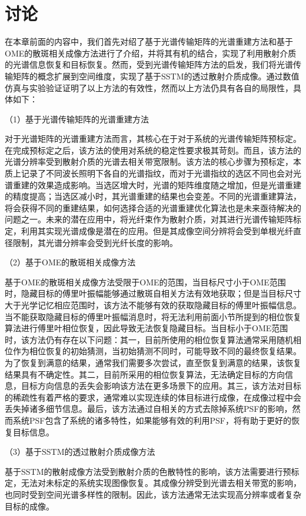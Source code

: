 \section{讨论}

在本章前面的内容中，我们首先对绍了基于光谱传输矩阵的光谱重建方法和基于OME的散斑相关成像方法进行了介绍，并将其有机的结合，实现了利用散射介质的光谱信息恢复和目标恢复。然而，受到光谱传输矩阵方法的启发，我们将光谱传输矩阵的概念扩展到空间维度，实现了基于SSTM的透过散射介质成像。通过数值仿真与实验验证证明了以上方法的有效性，然而以上方法仍具有各自的局限性，具体如下：

（1）基于光谱传输矩阵的光谱重建方法

对于光谱矩阵的光谱重建方法而言，其核心在于对于系统的光谱传输矩阵预标定。在完成预标定之后，该方法的使用对系统的稳定性要求极其苛刻。而且，该方法的光谱分辨率受到散射介质的光谱去相关带宽限制。该方法的核心步骤为预标定，本质上记录了不同波长照明下各自的光谱指纹，而对于光谱指纹的选区不同也会对光谱重建的效果造成影响。当选区增大时，光谱的矩阵维度随之增加，但是光谱重建的精度提高；当选区减小时，其光谱重建的结果也会变差。不同的光谱重建算法，将会获得不同的重建结果，如何选择合适的光谱重建优化算法也是未来亟待解决的问题之一。未来的潜在应用中，将光纤束作为散射介质，对其进行光谱传输矩阵标定，利用其实现光谱成像是潜在的应用。但是其成像空间分辨将会受到单根光纤直径限制，其光谱分辨率会受到光纤长度的影响。

（2）基于OME的散斑相关成像方法

基于OME的散斑相关成像方法受限于OME的范围，当目标尺寸小于OME范围时，隐藏目标的傅里叶振幅能够通过散斑自相关方法有效地获取；但是当目标尺寸大于光学记忆相应范围时，该方法不能够有效的获取隐藏目标的傅里叶振幅信息。当不能获取隐藏目标的傅里叶振幅消息时，将无法利用前面小节所提到的相位恢复算法进行傅里叶相位恢复，因此导致无法恢复隐藏目标。当目标小于OME范围时，该方法仍有存在以下问题：其一，目前所使用的相位恢复算法通常采用随机相位作为相位恢复的初始猜测，当初始猜测不同时，可能导致不同的最终恢复结果。为了恢复到满意的结果，通常我们需要多次尝试，直至恢复到满意的结果，该恢复结果具有不确定性。其二，目前所采用的相位恢复算法，无法确定目标的方向信息，目标方向信息的丢失会影响该方法在更多场景下的应用。其三，该方法对目标的稀疏性有着严格的要求，通常难以实现连续的体目标进行成像，在成像过程中会丢失掉诸多细节信息。最后，该方法通过自相关的方式去除掉系统PSF的影响，然而系统PSF包含了系统的诸多特性，如果能够有效的利用PSF，将有助于更好的恢复目标信息。

（3）基于SSTM的透过散射介质成像方法

基于SSTM的散射成像方法受到散射介质的色散特性的影响，该方法需要进行预标定，无法对未标定的系统实现图像恢复。其成像分辨受到光谱去相关带宽的影响，也同时受到空间光谱多样性的限制。因此，该方法通常无法实现高分辨率或者复杂目标的成像。

